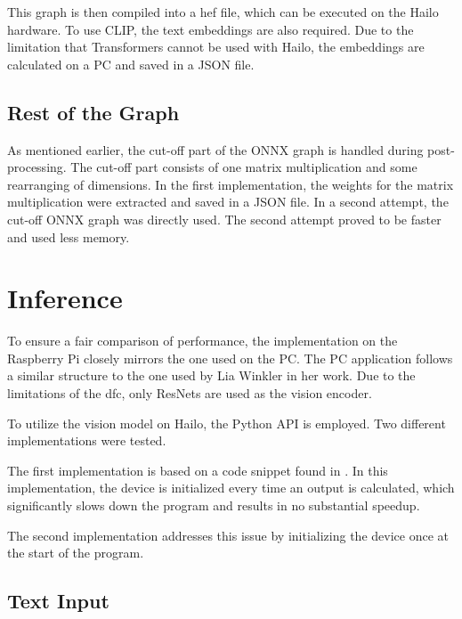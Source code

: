 This graph is then compiled into a \acrshort{hef} file, which can be executed on the Hailo hardware.
To use CLIP, the text embeddings are also required.
Due to the limitation that Transformers cannot be used with Hailo, the embeddings are calculated on a PC and saved in a JSON file.

\subsection{Rest of the Graph}

As mentioned earlier, the cut-off part of the ONNX graph is handled during post-processing. 
The cut-off part consists of one matrix multiplication and some rearranging of dimensions. 
In the first implementation, the weights for the matrix multiplication were extracted and saved in a JSON file.
In a second attempt, the cut-off ONNX graph was directly used.
The second attempt proved to be faster and used less memory.

\section{Inference}

To ensure a fair comparison of performance, the implementation on the Raspberry Pi closely mirrors the one used on the PC. 
The PC application follows a similar structure to the one used by Lia Winkler in her work.
Due to the limitations of the \acrshort{dfc}, only ResNets are used as the vision encoder.

To utilize the vision model on Hailo, the Python API is employed. 
Two different implementations were tested.

The first implementation is based on a code snippet found in \cite{hailoimplementation}.
In this implementation, the device is initialized every time an output is calculated, which significantly slows down the program and results in no substantial speedup.

The second implementation addresses this issue by initializing the device once at the start of the program. 

\subsection{Text Input}

